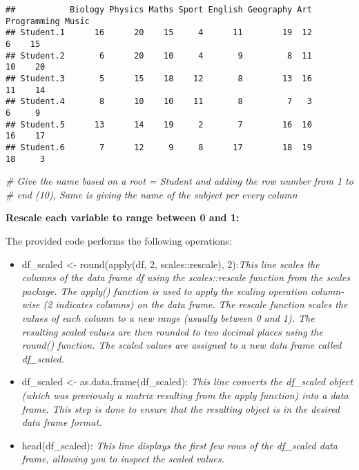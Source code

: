 \documentclass[
]{article}
\newenvironment{Shaded}{\begin{snugshade}}{\end{snugshade}}
\newcommand{\CommentTok}[1]{\textcolor[rgb]{0.56,0.35,0.01}{\textit{#1}}}
\begin{document}
\begin{verbatim}
##           Biology Physics Maths Sport English Geography Art Programming Music
## Student.1      16      20    15     4      11        19  12           6    15
## Student.2       6      20    10     4       9         8  11          10    20
## Student.3       5      15    18    12       8        13  16          11    14
## Student.4       8      10    10    11       8         7   3           6     9
## Student.5      13      14    19     2       7        16  10          16    17
## Student.6       7      12     9     8      17        18  19          18     3
\end{verbatim}

\begin{Shaded}
\begin{Highlighting}[]
\CommentTok{\# Give the name based on a root = Student and adding the row number from 1 to }
\CommentTok{\# end (10), Same is giving the name of the subject per every column}
\end{Highlighting}
\end{Shaded}

\textbf{Rescale each variable to range between 0 and 1:}

The provided code performs the following operations:

\begin{itemize}
\item
  df\_scaled \textless- round(apply(df, 2, scales::rescale),
  2):\emph{This line scales the columns of the data frame df using the
  scales::rescale function from the scales package. The apply() function
  is used to apply the scaling operation column-wise (2 indicates
  columns) on the data frame. The rescale function scales the values of
  each column to a new range (usually between 0 and 1). The resulting
  scaled values are then rounded to two decimal places using the round()
  function. The scaled values are assigned to a new data frame called
  df\_scaled.}
\item
  df\_scaled \textless- as.data.frame(df\_scaled): \emph{This line
  converts the df\_scaled object (which was previously a matrix
  resulting from the apply function) into a data frame. This step is
  done to ensure that the resulting object is in the desired data frame
  format.}
\item
  head(df\_scaled): \emph{This line displays the first few rows of the
  df\_scaled data frame, allowing you to inspect the scaled values.}
\end{itemize}
\end{document}
